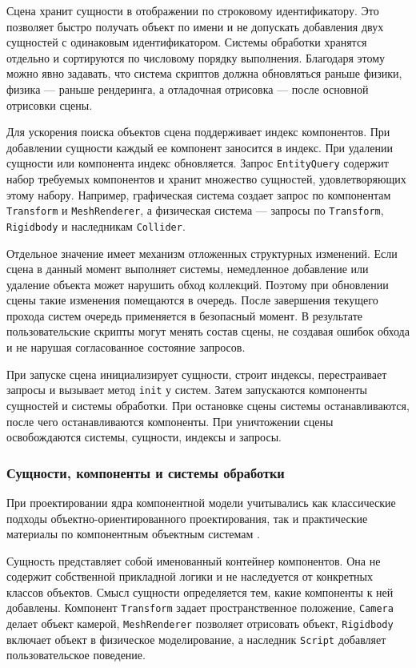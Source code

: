 Сцена хранит сущности в отображении по строковому идентификатору. Это
позволяет быстро получать объект по имени и не допускать добавления двух
сущностей с одинаковым идентификатором. Системы обработки хранятся отдельно
и сортируются по числовому порядку выполнения. Благодаря этому можно явно
задавать, что система скриптов должна обновляться раньше физики, физика —
раньше рендеринга, а отладочная отрисовка — после основной отрисовки сцены.

Для ускорения поиска объектов сцена поддерживает индекс компонентов. При
добавлении сущности каждый ее компонент заносится в индекс. При удалении
сущности или компонента индекс обновляется. Запрос \texttt{EntityQuery} содержит
набор требуемых компонентов и хранит множество сущностей, удовлетворяющих
этому набору. Например, графическая система создает запрос по компонентам
\texttt{Transform} и \texttt{MeshRenderer}, а физическая система — запросы по
\texttt{Transform}, \texttt{Rigidbody} и наследникам \texttt{Collider}.

Отдельное значение имеет механизм отложенных структурных изменений. Если
сцена в данный момент выполняет системы, немедленное добавление или удаление
объекта может нарушить обход коллекций. Поэтому при обновлении сцены такие
изменения помещаются в очередь. После завершения текущего прохода систем
очередь применяется в безопасный момент. В результате пользовательские скрипты
могут менять состав сцены, не создавая ошибок обхода и не нарушая согласованное
состояние запросов.

При запуске сцена инициализирует сущности, строит индексы, перестраивает
запросы и вызывает метод \texttt{init} у систем. Затем запускаются компоненты
сущностей и системы обработки. При остановке сцены системы останавливаются,
после чего останавливаются компоненты. При уничтожении сцены освобождаются
системы, сущности, индексы и запросы.

\subsubsection{Сущности, компоненты и системы обработки}

При проектировании ядра компонентной модели учитывались как классические
подходы объектно-ориентированного проектирования, так и практические материалы
по компонентным объектным системам \cite{gamma-patterns,bilas-object-system,west-hierarchy}.

Сущность представляет собой именованный контейнер компонентов. Она не содержит
собственной прикладной логики и не наследуется от конкретных классов объектов.
Смысл сущности определяется тем, какие компоненты к ней добавлены. Компонент
\texttt{Transform} задает пространственное положение, \texttt{Camera} делает
объект камерой, \texttt{MeshRenderer} позволяет отрисовать объект,
\texttt{Rigidbody} включает объект в физическое моделирование, а наследник
\texttt{Script} добавляет пользовательское поведение.

